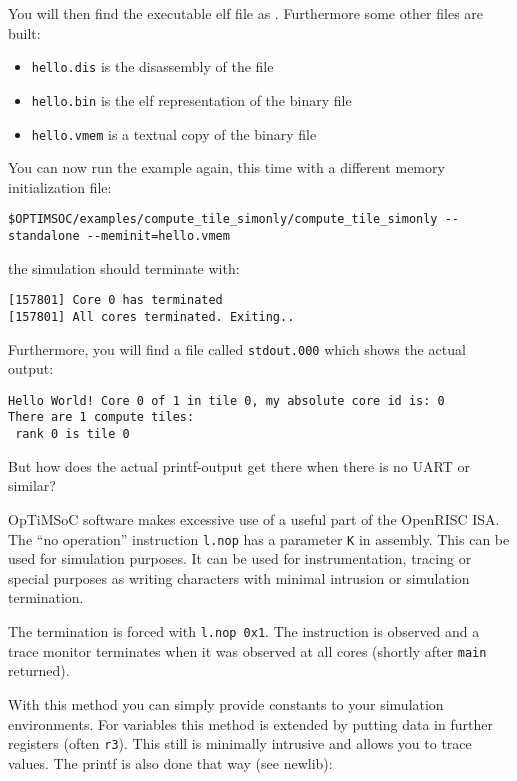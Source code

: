 You will then find the executable elf file as .
Furthermore some other files are built:

\begin{itemize}
\item \verb|hello.dis| is the disassembly of the file
\item \verb|hello.bin| is the elf representation of the binary file
\item \verb|hello.vmem| is a textual copy of the binary file
\end{itemize}

You can now run the example again, this time with a different memory
initialization file:

\begin{lstlisting}
$OPTIMSOC/examples/compute_tile_simonly/compute_tile_simonly --standalone --meminit=hello.vmem
\end{lstlisting}

the simulation should terminate with:

\begin{lstlisting}
[157801] Core 0 has terminated
[157801] All cores terminated. Exiting..
\end{lstlisting}

Furthermore, you will find a file called \verb|stdout.000| which shows
the actual output:

\begin{lstlisting}
Hello World! Core 0 of 1 in tile 0, my absolute core id is: 0
There are 1 compute tiles:
 rank 0 is tile 0
\end{lstlisting}

But how does the actual printf-output get there when there is no UART
or similar?

OpTiMSoC software makes excessive use of a useful part of the OpenRISC ISA. The
``no operation'' instruction \verb|l.nop| has a parameter \verb|K| in assembly.
This can be used for simulation purposes. It can be used for instrumentation,
tracing or special purposes as writing characters with minimal intrusion or
simulation termination.

The termination is forced with \verb|l.nop 0x1|. The instruction is
observed and a trace monitor terminates when it was observed at all
cores (shortly after \verb|main| returned).

With this method you can simply provide constants to your simulation
environments. For variables this method is extended by putting data in
further registers (often \verb|r3|). This still is minimally intrusive
and allows you to trace values. The printf is also done that way (see
newlib):

